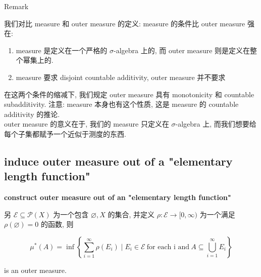 \documentclass{qlnotes-export}
\begin{document}
\begin{qlremark}{Remark}

我们对比 measure 和 outer measure 的定义: measure 的条件比 outer measure 强在:

\begin{enumerate}
\item
  measure 是定义在一个严格的 \(\sigma\)-algebra 上的, 而 outer measure 则是定义在整个幂集上的.
\item
  measure 要求 disjoint countable additivity, outer measure 并不要求
\end{enumerate}

\end{qlremark}

在这两个条件的缩减下, 我们规定 outer measure 具有 monotonicity 和 countable subadditivity. 注意: measure 本身也有这个性质, 这是 measure 的 countable additivity 的推论.\\
outer measure 的意义在于, 我们的 measure 只定义在 \(\sigma\)-algebra 上, 而我们想要给每个子集都赋予一个近似于测度的东西.

\subsection{induce outer measure out of a "elementary length function"}\label{induce-outer-measure-out-of-a-elementary-length-function}

\begin{theorem}{\protect{}\label{kn-construct-outer-measure-out-of-an-elementary-length-function}{\textbf{construct
outer measure out of an "elementary length function"}}}\label{thm-02-outer-measure-completion-of-a-measurable-space-construct-outer-measure-out-of-an-elementary-length-function}

另 \(\mathcal{E} \subseteq \mathcal{P}(X)\) 为一个包含 \(\varnothing,X\) 的集合, 并定义 \(\rho:\mathcal{E}\rightarrow\lbrack 0,\infty)\) 为一个满足 \(\rho(\varnothing) = 0\) 的函数, 则

\[\mu^{\ast}(A) = \inf\left\{ {\sum\limits_{i = 1}^{\infty}\rho(E_{i}) \mid E_{i} \in \mathcal{E}\ \text{for each i and}\ A \subseteq \bigcup\limits_{i = 1}^{\infty}E_{i}} \right\}\]

is an outer measure.

\end{theorem}
\end{document}
